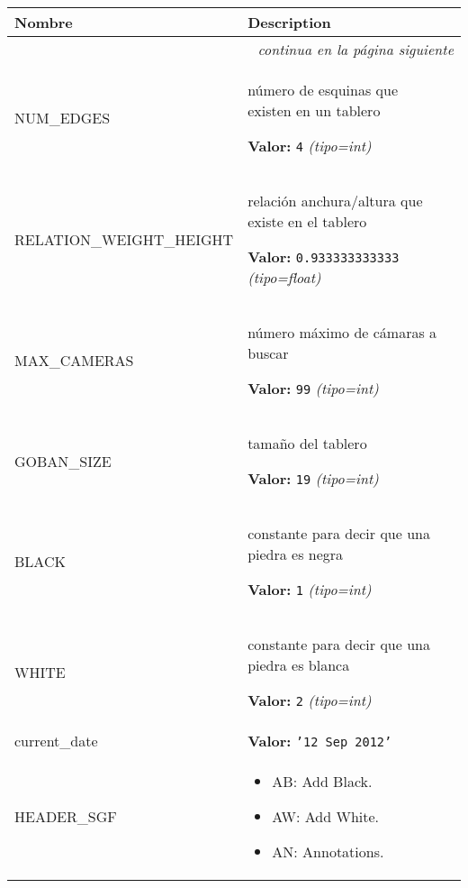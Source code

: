     \vspace{-1cm}
\hspace{\varindent}\begin{longtable}{|p{\varnamewidth}|p{\vardescrwidth}|l}
\cline{1-2}
\cline{1-2} \centering \textbf{Nombre} & \centering \textbf{Description}& \\
\cline{1-2}
\endhead\cline{1-2}\multicolumn{3}{r}{\small\textit{continua en la página siguiente}}\\\endfoot\cline{1-2}
\endlastfoot\raggedright N\-U\-M\-\_\-E\-D\-G\-E\-S\- & \raggedright número de esquinas que existen en un tablero

\textbf{Valor:} 
{\tt 4}            {\it (tipo=int)}&\\
\cline{1-2}
\raggedright R\-E\-L\-A\-T\-I\-O\-N\-\_\-W\-E\-I\-G\-H\-T\-\_\-H\-E\-I\-G\-H\-T\- & \raggedright relación anchura/altura que existe en el tablero

\textbf{Valor:} 
{\tt 0.933333333333}            {\it (tipo=float)}&\\
\cline{1-2}
\raggedright M\-A\-X\-\_\-C\-A\-M\-E\-R\-A\-S\- & \raggedright número máximo de cámaras a buscar

\textbf{Valor:} 
{\tt 99}            {\it (tipo=int)}&\\
\cline{1-2}
\raggedright G\-O\-B\-A\-N\-\_\-S\-I\-Z\-E\- & \raggedright tamaño del tablero

\textbf{Valor:} 
{\tt 19}            {\it (tipo=int)}&\\
\cline{1-2}
\raggedright B\-L\-A\-C\-K\- & \raggedright constante para decir que una piedra es negra

\textbf{Valor:} 
{\tt 1}            {\it (tipo=int)}&\\
\cline{1-2}
\raggedright W\-H\-I\-T\-E\- & \raggedright constante para decir que una piedra es blanca

\textbf{Valor:} 
{\tt 2}            {\it (tipo=int)}&\\
\cline{1-2}
\raggedright c\-u\-r\-r\-e\-n\-t\-\_\-d\-a\-t\-e\- & \raggedright \textbf{Valor:} 
{\tt \texttt{'}\texttt{12 Sep 2012}\texttt{'}}&\\
\cline{1-2}
\raggedright H\-E\-A\-D\-E\-R\-\_\-S\-G\-F\- & \raggedright %
\begin{itemize}

\item AB: Add Black.

\item AW: Add White.

\item AN: Annotations.


\end{itemize}
\end{longtable}
